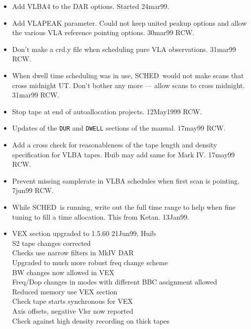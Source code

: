 \documentclass{report}
\newcommand{\schedb}{{\sc SCHED~}}
\begin{document}
\begin{itemize}
\item  Add VLBA4 to the DAR options.  Started 24mar99.

\item  Add VLAPEAK parameter.  Could not keep united peakup options
       and allow the various VLA reference pointing options.
       30mar99 RCW.

\item  Don't make a crd.y file when scheduling pure VLA observations.
       31mar99 RCW.

\item  When dwell time scheduling was in use, \schedb would not make
       scans that cross midnight UT.  Don't bother any more --- allow
       scans to cross midnight.  31mar99 RCW.

\item  Stop tape at end of autoallocation projects.  12May1999 RCW.

\item  Updates of the {\tt DUR} and {\tt DWELL} sections of the manual.
       17may99 RCW.

\item  Add a cross check for reasonableness of the tape length and
       density specification for VLBA tapes.  Huib may add same for
       Mark IV.  17may99 RCW.

\item  Prevent missing samplerate in VLBA schedules when first scan
       is pointing.  7jun99 RCW.

\item  While \schedb is running, write out the full time range to help
       when fine tuning to fill a time allocation.  This from Ketan.
       13Jan99.

\item  VEX section upgraded to 1.5.60 21Jun99, Huib\\
       S2 tape changes corrected\\
       Checks use narrow filters in MkIV DAR\\
       Upgraded to much more robust freq change scheme\\
       BW changes now allowed in VEX\\
       Freq/Dop changes in modes with different BBC assignment allowed\\
       Reduced memory use VEX section\\
       Check tape starts synchronous for VEX\\
       Axis offsets, negative Vlsr now reported\\
       Check against high density recording on thick tapes\\


\end{itemize}
\end{document}
